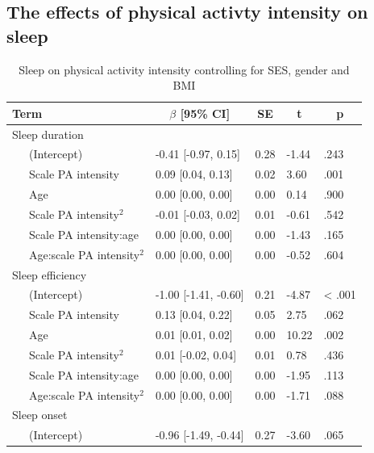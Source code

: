 \documentclass[
  man]{apa6}
\begin{document}
\hypertarget{the-effects-of-physical-activty-intensity-on-sleep}{%
\subsection{The effects of physical activty intensity on sleep}\label{the-effects-of-physical-activty-intensity-on-sleep}}

\begin{table}[tbp]

\begin{center}
\begin{threeparttable}

\caption{\label{tab:sleep-by-intensity}Sleep on physical activity intensity controlling for SES, gender and BMI}

\begin{tabular}{lllll}
\toprule
Term & \multicolumn{1}{c}{$\beta$ [95\% CI]} & \multicolumn{1}{c}{SE} & \multicolumn{1}{c}{t} & \multicolumn{1}{c}{p}\\
\midrule
Sleep duration &  &  &  & \\
\ \ \ (Intercept) & -0.41 [-0.97, 0.15] & 0.28 & -1.44 & .243\\
\ \ \ Scale PA intensity & 0.09 [0.04, 0.13] & 0.02 & 3.60 & .001\\
\ \ \ Age & 0.00 [0.00, 0.00] & 0.00 & 0.14 & .900\\
\ \ \ Scale PA intensity$^2$ & -0.01 [-0.03, 0.02] & 0.01 & -0.61 & .542\\
\ \ \ Scale PA intensity:age & 0.00 [0.00, 0.00] & 0.00 & -1.43 & .165\\
\ \ \ Age:scale PA intensity$^2$ & 0.00 [0.00, 0.00] & 0.00 & -0.52 & .604\\
Sleep efficiency &  &  &  & \\
\ \ \ (Intercept) & -1.00 [-1.41, -0.60] & 0.21 & -4.87 & < .001\\
\ \ \ Scale PA intensity & 0.13 [0.04, 0.22] & 0.05 & 2.75 & .062\\
\ \ \ Age & 0.01 [0.01, 0.02] & 0.00 & 10.22 & .002\\
\ \ \ Scale PA intensity$^2$ & 0.01 [-0.02, 0.04] & 0.01 & 0.78 & .436\\
\ \ \ Scale PA intensity:age & 0.00 [0.00, 0.00] & 0.00 & -1.95 & .113\\
\ \ \ Age:scale PA intensity$^2$ & 0.00 [0.00, 0.00] & 0.00 & -1.71 & .088\\
Sleep onset &  &  &  & \\
\ \ \ (Intercept) & -0.96 [-1.49, -0.44] & 0.27 & -3.60 & .065\\

\end{tabular}
\end{threeparttable}
\end{center}
\end{table}
\end{document}

